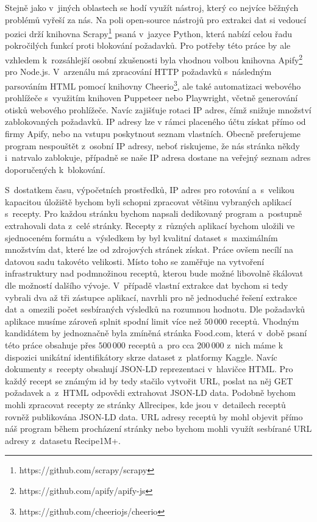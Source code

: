 Stejně jako v~jiných oblastech se hodí využít nástroj, který co nejvíce běžných problémů vyřeší za nás. Na poli open-source nástrojů pro extrakci dat si vedoucí pozici drží knihovna Scrapy\footnote{https://github.com/scrapy/scrapy} psaná v~jazyce Python, která nabízí celou řadu pokročilých funkcí proti blokování požadavků. Pro potřeby této práce by ale vzhledem k~rozsáhlejší osobní zkušenosti byla vhodnou volbou knihovna Apify\footnote{https://github.com/apify/apify-js} pro Node.js. V~arzenálu má zpracování HTTP požadavků s~následným parsováním HTML pomocí knihovny Cheerio\footnote{https://github.com/cheeriojs/cheerio}, ale také automatizaci webového prohlížeče s~využitím knihoven Puppeteer nebo Playwright, včetně generování otisků webového prohlížeče. Navíc zajišťuje rotaci IP adres, čímž snižuje množství zablokovaných požadavků. IP adresy lze v rámci placeného účtu získat přímo od firmy Apify, nebo na vstupu poskytnout seznam vlastních. Obecně preferujeme program nespouštět z~osobní IP adresy, neboť riskujeme, že nás stránka někdy i~natrvalo zablokuje, případně se naše IP adresa dostane na veřejný seznam adres doporučených k~blokování.

S~dostatkem času, výpočetních prostředků, IP adres pro rotování a~s~velikou kapacitou úložiště bychom byli schopni zpracovat většinu vybraných aplikací s~recepty. Pro každou stránku bychom napsali dedikovaný program a~postupně extrahovali data z~celé stránky. Recepty z~různých aplikací bychom uložili ve sjednoceném formátu a~výsledkem by byl kvalitní dataset s~maximálním množstvím dat, které lze od zdrojových stránek získat. Práce ovšem necílí na datovou sadu takovéto velikosti. Místo toho se zaměřuje na vytvoření infrastruktury nad podmnožinou receptů, kterou bude možné libovolně škálovat dle možností dalšího vývoje. V~případě vlastní extrakce dat bychom si tedy vybrali dva až tři zástupce aplikací, navrhli pro ně jednoduché řešení extrakce dat a~omezili počet sesbíraných výsledků na rozumnou hodnotu. Dle požadavků aplikace musíme zároveň splnit spodní limit více než $50\,000$ receptů. Vhodným kandidátem by jednoznačně byla zmíněná stránka Food.com, která v~době psaní této práce obsahuje přes $500\,000$ receptů a~pro cca $200\,000$ z~nich máme k dispozici unikátní identifikátory skrze dataset z~platformy Kaggle. Navíc dokumenty s~recepty obsahují JSON-LD reprezentaci v~hlavičce HTML. Pro každý recept se známým id by tedy stačilo vytvořit URL, poslat na něj GET požadavek a~z~HTML odpovědi extrahovat JSON-LD data. Podobně bychom mohli zpracovat recepty ze stránky Allrecipes, kde jsou v~detailech receptů rovněž publikována JSON-LD data. URL adresy receptů by mohl objevit přímo náš program během procházení stránky nebo bychom mohli využít sesbírané URL adresy z~datasetu Recipe1M+.

